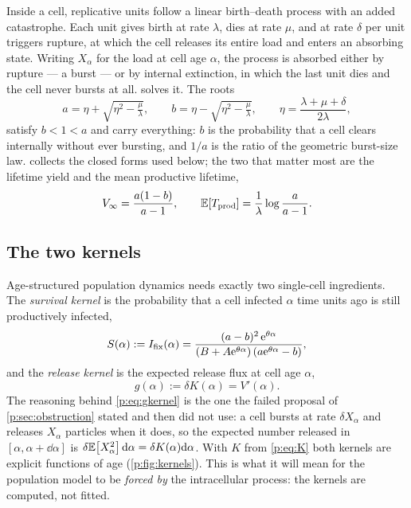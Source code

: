 Inside a cell, replicative units follow a linear birth--death process with
an added catastrophe. Each unit gives birth at rate $\lambda$, dies at rate
$\mu$, and at rate $\delta$ per unit triggers rupture, at which the cell
releases its entire load and enters an absorbing state. Writing $X_\alpha$
for the load at cell age $\alpha$, the process is absorbed either by
rupture --- a burst --- or by internal extinction, in which the last unit
dies and the cell never bursts at all. \ChCorecap{} solves it. The roots
\begin{equation}
a=\eta+\sqrt{\eta^2-\tfrac{\mu}{\lambda}},\qquad
b=\eta-\sqrt{\eta^2-\tfrac{\mu}{\lambda}},\qquad
\eta=\frac{\lambda+\mu+\delta}{2\lambda},
\label{p:eq:roots}
\end{equation}
satisfy $b<1<a$ and carry everything: $b$ is the probability that a cell
clears internally without ever bursting, and $1/a$ is the ratio of the
geometric burst-size law.  collects the closed forms used
below; the two that matter most are the lifetime yield and the mean
productive lifetime,
\begin{equation}
V_\infty=\frac{a(1-b)}{a-1},
\qquad
\mathbb{E}\!\left[T_{\rm prod}\right]=\frac{1}{\lambda}\log\frac{a}{a-1}.
\label{p:eq:Vinf-Tprod}
\end{equation}

\subsection{The two kernels}

Age-structured population dynamics needs exactly two single-cell
ingredients. The \emph{survival kernel} is the probability that a cell
infected $\alpha$ time units ago is still productively infected,
\begin{equation}
S(\alpha):=I_{\mathrm{fix}}(\alpha)=\frac{(a-b)^2\,\mathrm{e}^{\theta\alpha}}
{\left(B+A\mathrm{e}^{\theta\alpha}\right)\left(a\mathrm{e}^{\theta\alpha}-b\right)},
\label{p:eq:Skernel}
\end{equation}
and the \emph{release kernel} is the expected release flux at cell age
$\alpha$,
\begin{equation}
g(\alpha):=\delta K(\alpha)=V'(\alpha).
\label{p:eq:gkernel}
\end{equation}
The reasoning behind \cref{p:eq:gkernel} is the one the failed proposal of
\cref{p:sec:obstruction} stated and then did not use: a cell bursts at rate
$\delta X_\alpha$ and releases $X_\alpha$ particles when it does, so the
expected number released in $[\alpha,\alpha+\dd\alpha]$ is
$\delta\mathbb{E}\!\left[X_\alpha^2\right]\mathrm{d}\alpha=\delta K(\alpha)\mathrm{d}\alpha$. With $K$ from
\cref{p:eq:K} both kernels are explicit functions of age
(\cref{p:fig:kernels}). This is what it will mean for the population model
to be \emph{forced by} the intracellular process: the kernels are computed,
not fitted.

